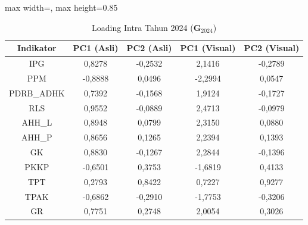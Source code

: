 \begin{table}[H]
\centering
\caption{Loading Intra Tahun 2024 ($\mathbf{G}_{2024}$)} \label{tab:app1loading_intra_2024}
\begin{adjustbox}{max width=\textwidth, max height=0.85\textheight}
\begin{tabular}{|c|c|c|c|c|}
\hline
\textbf{Indikator} & \textbf{PC1 (Asli)} & \textbf{PC2 (Asli)} & \textbf{PC1 (Visual)} & \textbf{PC2 (Visual)} \\
\hline
IPG & 0,8278 & -0,2532 & 2,1416 & -0,2789 \\
PPM & -0,8888 & 0,0496 & -2,2994 & 0,0547 \\
PDRB\_ADHK & 0,7392 & -0,1568 & 1,9124 & -0,1727 \\
RLS & 0,9552 & -0,0889 & 2,4713 & -0,0979 \\
AHH\_L & 0,8948 & 0,0799 & 2,3150 & 0,0880 \\
AHH\_P & 0,8656 & 0,1265 & 2,2394 & 0,1393 \\
GK & 0,8830 & -0,1267 & 2,2844 & -0,1396 \\
PKKP & -0,6501 & 0,3753 & -1,6819 & 0,4133 \\
TPT & 0,2793 & 0,8422 & 0,7227 & 0,9277 \\
TPAK & -0,6862 & -0,2910 & -1,7753 & -0,3206 \\
GR & 0,7751 & 0,2748 & 2,0054 & 0,3026 \\
\hline
\end{tabular}
\end{adjustbox}
\end{table}